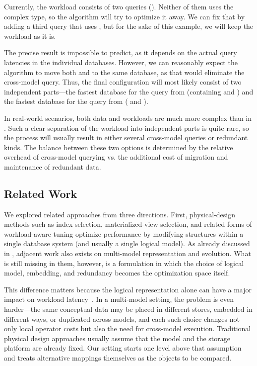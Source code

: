 \begin{example}
\label{ex:aimm-result}
Currently, the workload consists of two queries (). Neither of them uses the  complex type, so the algorithm will try to optimize it away. We can fix that by adding a third query that uses , but for the sake of this example, we will keep the workload as it is.

The precise result is impossible to predict, as it depends on the actual query latencies in the individual databases. However, we can reasonably expect the algorithm to move both  and  to the same database, as that would eliminate the cross-model query. Thus, the final configuration will most likely consist of two independent parts---the fastest database for the query from  (containing  and ) and the fastest database for the query from  ( and ).
\end{example}

In real-world scenarios, both data and workloads are much more complex than in . Such a clear separation of the workload into independent parts is quite rare, so the process will usually result in either several cross-model queries or redundant kinds. The balance between these two options is determined by the relative overhead of cross-model querying vs. the additional cost of migration and maintenance of redundant data.

\subsection{Related Work}

We explored related approaches from three directions. First, physical-design methods such as index selection, materialized-view selection, and related forms of workload-aware tuning optimize performance by modifying structures within a single database system (and usually a single logical model). As already discussed in , adjacent work also exists on multi-model representation and evolution. What is still missing in them, however, is a formulation in which the choice of logical model, embedding, and redundancy becomes the optimization space itself.

This difference matters because the logical representation alone can have a major impact on workload latency~\citep{10.1145/3183713.3199671}. In a multi-model setting, the problem is even harder---the same conceptual data may be placed in different stores, embedded in different ways, or duplicated across models, and each such choice changes not only local operator costs but also the need for cross-model execution. Traditional physical design approaches usually assume that the model and the storage platform are already fixed. Our setting starts one level above that assumption and treats alternative mappings themselves as the objects to be compared.

